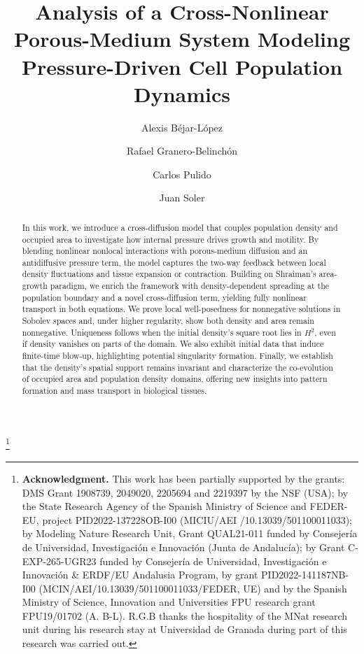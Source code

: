 \documentclass[12pt]{amsart}
\title[Pressure-Driven Cross-Diffusive Porous-Medium System]{Analysis of a Cross-Nonlinear Porous-Medium System Modeling Pressure-Driven Cell Population Dynamics}
\author[A. B\'ejar-L\'opez]{Alexis B\'ejar-L\'opez}
\author[R. Granero-Belinch\'on]{Rafael Granero-Belinch\'on}
\author[C. Pulido]{Carlos Pulido}
\author[J. Soler]{Juan Soler}
\begin{document}
\overfullrule 1mm
	
	


\thanks{\textbf{Acknowledgment.}  This work has been partially supported by the grants: DMS Grant  1908739, 2049020, 2205694 and 2219397 by the NSF (USA);  by the State Research Agency of the Spanish Ministry of Science and FEDER-EU, project PID2022-137228OB-I00 (MICIU/AEI /10.13039/501100011033); by Modeling Nature Research Unit, Grant QUAL21-011 funded by Consejer\'ia de Universidad, Investigaci\'on e Innovaci\'on (Junta de Andaluc\'ia); by Grant C-EXP-265-UGR23 funded by
Consejer\'ia de Universidad, Investigaci\'on e Innovaci\'on \& ERDF/EU
Andalusia Program, by grant PID2022-141187NB-I00 (MCIN/AEI/10.13039/501100011033/FEDER, UE) and by the Spanish Ministry of Science, Innovation and Universities FPU research grant FPU19/01702 (A. B-L). R.G.B thanks the hospitality of the MNat research unit during his research stay at Universidad de Granada during part of this research was carried out.}


	\begin{abstract}
		In this work, we introduce a cross-diffusion model that couples population density and occupied area to investigate how internal pressure drives growth and motility. By blending nonlinear nonlocal interactions with porous-medium diffusion and an antidiffusive pressure term, the model captures the two-way feedback between local density fluctuations and tissue expansion or contraction. Building on Shraiman’s area-growth paradigm, we enrich the framework with density-dependent spreading at the population boundary and a novel cross-diffusion term, yielding fully nonlinear transport in both equations. We prove local well-posedness for nonnegative solutions in Sobolev spaces and, under higher regularity, show both density and area remain nonnegative. Uniqueness follows when the initial density’s square root lies in $H^2$, even if density vanishes on parts of the domain. We also exhibit initial data that induce finite-time blow-up, highlighting potential singularity formation. Finally, we establish that the density’s spatial support remains invariant and characterize the co-evolution of occupied area and population density domains, offering new insights into pattern formation and mass transport in biological tissues. 
	\end{abstract}
 
\end{document}
